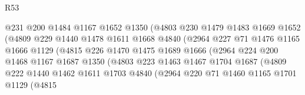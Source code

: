 \begin{lexlean}{R53}
\begin{coremodule}
                              @231
                              @200
                              @1484
                              @1167
                              @1652
                              @1350
                              (@4803
                                @230
                                @1479
                                @1483
                                @1669
                                @1652
                                (@4809
                                  @229
                                  @1440
                                  @1478
                                  @1611
                                  @1668
                                  @4840
                                  (@2964
                                    @227
                                    @71
                                    @1476
                                    @1165
                                    @1666
                                    @1129
                                    (@4815
                                      @226
                                      @1470
                                      @1475
                                      @1689
                                      @1666
                                      (@2964
                                        @224
                                        @200
                                        @1468
                                        @1167
                                        @1687
                                        @1350
                                        (@4803
                                          @223
                                          @1463
                                          @1467
                                          @1704
                                          @1687
                                          (@4809
                                            @222
                                            @1440
                                            @1462
                                            @1611
                                            @1703
                                            @4840
                                            (@2964
                                              @220
                                              @71
                                              @1460
                                              @1165
                                              @1701
                                              @1129
                                              (@4815

\end{coremodule}
\end{lexlean}
